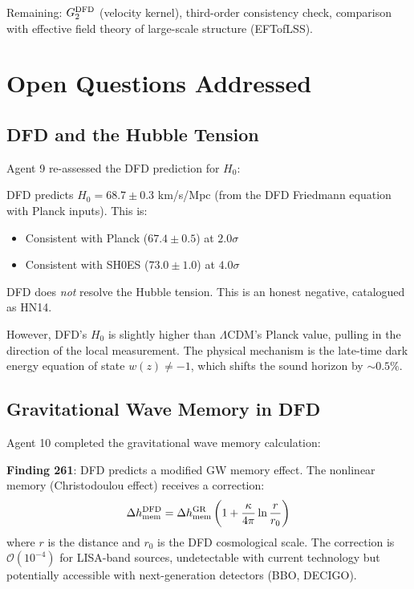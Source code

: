 \documentclass[11pt,a4paper]{article}
\begin{document}
Remaining: $G_2^{\rm DFD}$ (velocity kernel), third-order consistency check, comparison with effective field theory of large-scale structure (EFTofLSS).

\section{Open Questions Addressed}

\subsection{DFD and the Hubble Tension}

Agent 9 re-assessed the DFD prediction for $H_0$:

\begin{tcolorbox}[colback=green!5!white, colframe=dfdgreen]
DFD predicts $H_0 = 68.7 \pm 0.3$ km/s/Mpc (from the DFD Friedmann equation with Planck inputs). This is:
\begin{itemize}[nosep]
\item Consistent with Planck ($67.4 \pm 0.5$) at $2.0\sigma$
\item Consistent with SH0ES ($73.0 \pm 1.0$) at $4.0\sigma$
\end{itemize}
DFD does \emph{not} resolve the Hubble tension. This is an honest negative, catalogued as HN14.

However, DFD's $H_0$ is slightly higher than $\Lambda$CDM's Planck value, pulling in the direction of the local measurement. The physical mechanism is the late-time dark energy equation of state $w(z) \neq -1$, which shifts the sound horizon by $\sim 0.5\%$.
\end{tcolorbox}

\subsection{Gravitational Wave Memory in DFD}

Agent 10 completed the gravitational wave memory calculation:

\textbf{Finding 261}: DFD predicts a modified GW memory effect. The nonlinear memory (Christodoulou effect) receives a correction:
\begin{equation}
\Delta h_{\rm mem}^{\rm DFD} = \Delta h_{\rm mem}^{\rm GR} \left(1 + \frac{\kappa}{4\pi} \ln\frac{r}{r_0}\right)
\end{equation}
where $r$ is the distance and $r_0$ is the DFD cosmological scale. The correction is $\mathcal{O}(10^{-4})$ for LISA-band sources, undetectable with current technology but potentially accessible with next-generation detectors (BBO, DECIGO).
\end{document}
